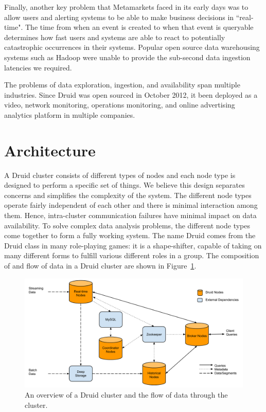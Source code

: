 \documentclass{sig-alternate-2013}
\begin{document}
Finally, another key problem that Metamarkets faced in its early days was to
allow users and alerting systems to be able to make business decisions in
``real-time". The time from when an event is created to when that
event is queryable determines how fast users and systems are able to react to
potentially catastrophic occurrences in their systems. Popular open source data
warehousing systems such as Hadoop were unable to provide the sub-second data ingestion
latencies we required. 

The problems of data exploration, ingestion, and availability span multiple
industries. Since Druid was open sourced in October 2012, it been deployed as a
video, network monitoring, operations monitoring, and online advertising
analytics platform in multiple companies.

\section{Architecture}
\label{sec:architecture}
A Druid cluster consists of different types of nodes and each node type is
designed to perform a specific set of things. We believe this design separates
concerns and simplifies the complexity of the system. The different node types
operate fairly independent of each other and there is minimal interaction
among them. Hence, intra-cluster communication failures have minimal impact
on data availability.  To solve complex data analysis problems, the different
node types come together to form a fully working system.  The name Druid comes
from the Druid class in many role-playing games: it is a shape-shifter, capable
of taking on many different forms to fulfill various different roles in a
group. The composition of and flow of data in a Druid cluster are shown in
Figure~\ref{fig:cluster}.

\begin{figure}
\centering
\includegraphics[width = 4.5in]{cluster}
\caption{An overview of a Druid cluster and the flow of data through the cluster.}
\label{fig:cluster}
\end{figure}
\end{document}
